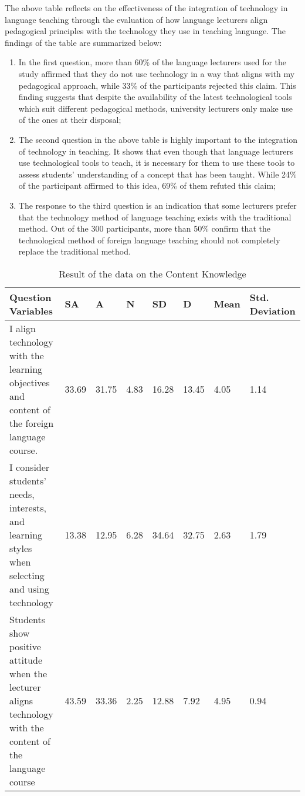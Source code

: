 \documentclass[english]{textolivre}
\begin{document}
The above table reflects on the effectiveness of the integration of technology in language teaching through the evaluation of how language lecturers align pedagogical principles with the technology they use in teaching language. The findings of the table are summarized below:

\begin{enumerate}
    \item In the first question, more than 60\% of the language lecturers used for the study affirmed that they do not use technology in a way that aligns with my pedagogical approach, while 33\% of the participants rejected this claim. This finding suggests that despite the availability of the latest technological tools which suit different pedagogical methods, university lecturers only make use of the ones at their disposal;
    \item The second question in the above table is highly important to the integration of technology in teaching. It shows that even though that language lecturers use technological tools to teach, it is necessary for them to use these tools to assess students’ understanding of a concept that has been taught. While 24\% of the participant affirmed to this idea, 69\% of them refuted this claim;
    \item The response to the third question is an indication that some lecturers prefer that the technology method of language teaching exists with the traditional method. Out of the 300 participants, more than 50\% confirm that the technological method of foreign language teaching should not completely replace the traditional method.
\end{enumerate}

\begin{table}[h!]
\caption{Result of the data on the Content Knowledge}
\label{tab5}
\begin{tabular}{|p{5cm}|l|l|l|l|l|l|l|}
\hline
Question Variables & SA & A & N & SD & D & Mean & Std. Deviation \\ \hline
I align technology with the learning objectives and content of the foreign language course. & 33.69 & 31.75 & 4.83 & 16.28 & 13.45 & 4.05 & 1.14 \\ \hline
I consider students’ needs, interests, and learning styles when selecting and using technology & 13.38 & 12.95 & 6.28 & 34.64 & 32.75 & 2.63 & 1.79 \\ \hline
Students show positive attitude when the lecturer aligns technology with the content of the language course & 43.59 & 33.36 & 2.25 & 12.88 & 7.92 & 4.95 & 0.94 \\ \hline
\end{tabular}
\end{table}
\end{document}
